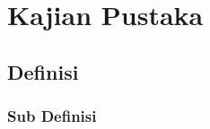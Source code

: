 \documentclass[../artesis.tex]{subfiles}
\begin{document}
\section{Kajian Pustaka}

\lipsum[1-5]

\subsection{Definisi}

\lipsum[6-8]

\subsubsection{Sub Definisi}
\lipsum[8-9]


\end{document}
